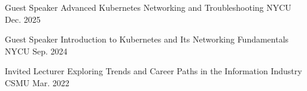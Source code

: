 
\begin{cvhonors}

  \cvhonor
    {Guest Speaker}
    {Advanced Kubernetes Networking and Troubleshooting}
    {NYCU}
    {Dec. 2025}

  \cvhonor
    {Guest Speaker}
    {Introduction to Kubernetes and Its Networking Fundamentals}
    {NYCU}
    {Sep. 2024}

  \cvhonor
    {Invited Lecturer}
    {Exploring Trends and Career Paths in the Information Industry}
    {CSMU}
    {Mar. 2022}

\end{cvhonors}
